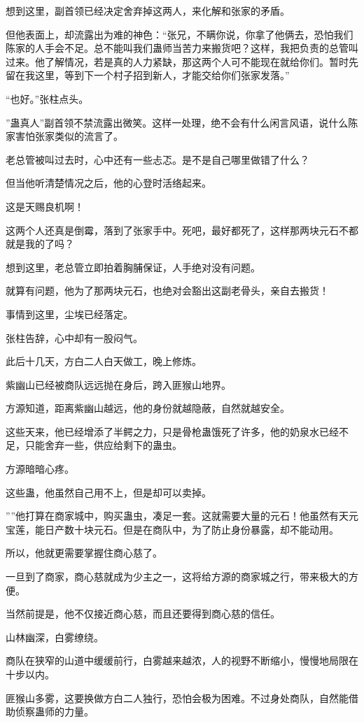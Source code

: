\begin{this_body}
想到这里，副首领已经决定舍弃掉这两人，来化解和张家的矛盾。

但他表面上，却流露出为难的神色：“张兄，不瞒你说，你拿了他俩去，恐怕我们陈家的人手会不足。总不能叫我们蛊师当苦力来搬货吧？这样，我把负责的总管叫过来。他了解情况，若是真的人力紧缺，那这两个人可不能现在就给你们。暂时先留在我这里，等到下一个村子招到新人，才能交给你们张家发落。”

“也好。”张柱点头。

”蛊真人”副首领不禁流露出微笑。这样一处理，绝不会有什么闲言风语，说什么陈家害怕张家类似的流言了。

老总管被叫过去时，心中还有一些忐忑。是不是自己哪里做错了什么？

但当他听清楚情况之后，他的心登时活络起来。

这是天赐良机啊！

这两个人还真是倒霉，落到了张家手中。死吧，最好都死了，这样那两块元石不都就是我的了吗？

想到这里，老总管立即拍着胸脯保证，人手绝对没有问题。

就算有问题，他为了那两块元石，也绝对会豁出这副老骨头，亲自去搬货！

事情到这里，尘埃已经落定。

张柱告辞，心中却有一股闷气。

此后十几天，方白二人白天做工，晚上修炼。

紫幽山已经被商队远远抛在身后，跨入匪猴山地界。

方源知道，距离紫幽山越远，他的身份就越隐蔽，自然就越安全。

这些天来，他已经增添了半鳄之力，只是骨枪蛊饿死了许多，他的奶泉水已经不足，只能舍弃一些，供应给剩下的蛊虫。

方源暗暗心疼。

这些蛊，他虽然自己用不上，但是却可以卖掉。

””他打算在商家城中，购买蛊虫，凑足一套。这就需要大量的元石！他虽然有天元宝莲，能日产数十块元石。但是在商队中，为了防止身份暴露，却不能动用。

所以，他就更需要掌握住商心慈了。

一旦到了商家，商心慈就成为少主之一，这将给方源的商家城之行，带来极大的方便。

当然前提是，他不仅接近商心慈，而且还要得到商心慈的信任。

山林幽深，白雾缭绕。

商队在狭窄的山道中缓缓前行，白雾越来越浓，人的视野不断缩小，慢慢地局限在十步以内。

匪猴山多雾，这要换做方白二人独行，恐怕会极为困难。不过身处商队，自然能借助侦察蛊师的力量。


\end{this_body}
